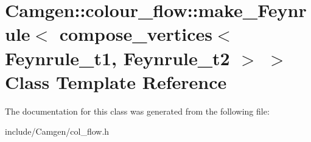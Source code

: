 \hypertarget{a00342}{\section{Camgen\-:\-:colour\-\_\-flow\-:\-:make\-\_\-\-Feynrule$<$ compose\-\_\-vertices$<$ Feynrule\-\_\-t1, Feynrule\-\_\-t2 $>$ $>$ Class Template Reference}
\label{a00342}
}


The documentation for this class was generated from the following file\-:\begin{DoxyCompactItemize}
\item 
include/\-Camgen/col\-\_\-flow.\-h\end{DoxyCompactItemize}
